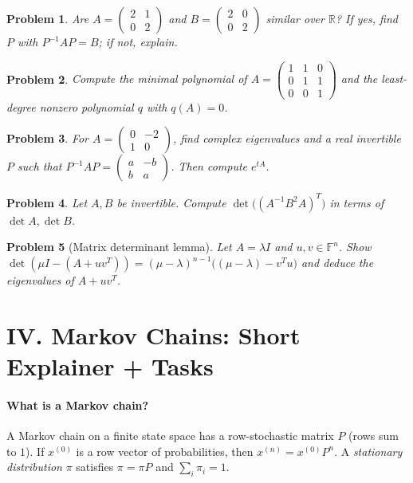 \documentclass[11pt]{article}
\theoremstyle{upright}
\newtheorem{problem}{Problem}
\begin{document}
\begin{problem}
Are 
$A=\begin{pmatrix}2&1\\0&2\end{pmatrix}$ and $B=\begin{pmatrix}2&0\\0&2\end{pmatrix}$ similar over $\mathbb{R}$? If yes, find $P$ with $P^{-1}AP=B$; if not, explain.
\end{problem}

\begin{problem}
Compute the minimal polynomial of $A=\begin{pmatrix}1&1&0\\0&1&1\\0&0&1\end{pmatrix}$ and the least-degree nonzero polynomial $q$ with $q(A)=0$.
\end{problem}

\begin{problem}
For $A=\begin{pmatrix}0&-2\\1&0\end{pmatrix}$, find complex eigenvalues and a real invertible $P$ such that 
$P^{-1}AP=\begin{pmatrix}a&-b\\ b&a\end{pmatrix}$. Then compute $e^{tA}$.
\end{problem}

\begin{problem}
Let $A,B$ be invertible. Compute $\det\big((A^{-1}B^2A)^T\big)$ in terms of $\det A,\det B$.
\end{problem}

\begin{problem}[Matrix determinant lemma]
Let $A=\lambda I$ and $u,v\in\mathbb{F}^n$. Show
$\det(\mu I-(A+uv^T))=(\mu-\lambda)^{n-1}\big((\mu-\lambda)-v^Tu\big)$
and deduce the eigenvalues of $A+uv^T$.
\end{problem}

\section*{IV. Markov Chains: Short Explainer + Tasks}

\paragraph{What is a Markov chain?} 
A Markov chain on a finite state space has a row-stochastic matrix $P$ (rows sum to $1$). 
If $x^{(0)}$ is a row vector of probabilities, then $x^{(n)}=x^{(0)}P^n$. 
A \emph{stationary distribution} $\pi$ satisfies $\pi=\pi P$ and $\sum_i \pi_i=1$.
\end{document}
